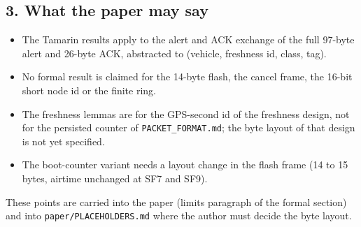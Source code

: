 \subsection*{3. What the paper may say}

\begin{itemize}
\item The Tamarin results apply to the alert and ACK exchange of the full 97-byte alert and 26-byte ACK, abstracted to (vehicle, freshness id, class, tag).
\item No formal result is claimed for the 14-byte flash, the cancel frame, the 16-bit short node id or the finite ring.
\item The freshness lemmas are for the GPS-second id of the freshness design, not for the persisted counter of \texttt{PACKET\_FORMAT.md}; the byte layout of that design is not yet specified.
\item The boot-counter variant needs a layout change in the flash frame (14 to 15 bytes, airtime unchanged at SF7 and SF9).
\end{itemize}

These points are carried into the paper (limits paragraph of the formal section) and into \texttt{paper/PLACEHOLDERS.md} where the author must decide the byte layout.

